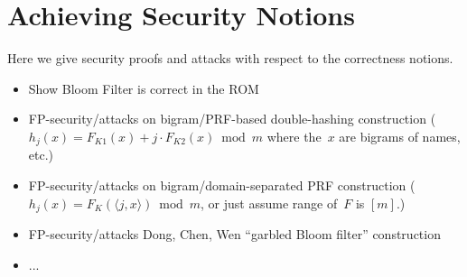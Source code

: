 \section{Achieving Security Notions}
  Here we give security proofs and attacks with respect to the correctness notions.
\begin{itemize}
\item Show Bloom Filter is correct in the ROM %
\item FP-security/attacks on bigram/PRF-based double-hashing construction ($h_j(x) = F_{K1}(x) + j\cdot F_{K2}(x) \bmod m$ where the~$x$ are bigrams of names, etc.) 
\item FP-security/attacks on bigram/domain-separated PRF construction ($h_j(x)=F_K(\langle j,x \rangle) \bmod m$, or just assume range of~$F$ is $[m]$.)
\item FP-security/attacks Dong, Chen, Wen ``garbled Bloom filter'' construction
\item ...
\end{itemize}

